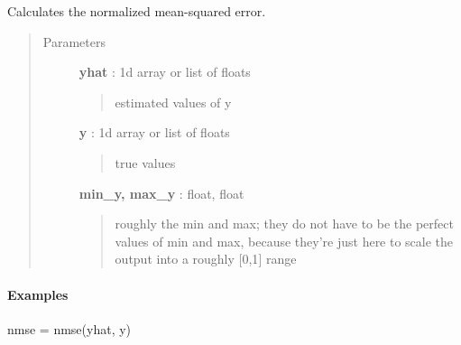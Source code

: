 \documentclass[letterpaper,10pt,english]{sphinxmanual}
\begin{document}
\begin{fulllineitems}
\label{qikify:qikify.helpers.nmse}
Calculates the normalized mean-squared error.
\begin{quote}\begin{description}
\item[{Parameters }] \leavevmode
\textbf{yhat} : 1d array or list of floats
\begin{quote}

estimated values of y
\end{quote}

\textbf{y} : 1d array or list of floats
\begin{quote}

true values
\end{quote}

\textbf{min\_y, max\_y} : float, float
\begin{quote}

roughly the min and max; they do not have to be the perfect values of min and max, because
they're just here to scale the output into a roughly {[}0,1{]} range
\end{quote}

\end{description}\end{quote}
\paragraph{Examples}

nmse = nmse(yhat, y)

\end{fulllineitems}

\end{document}

